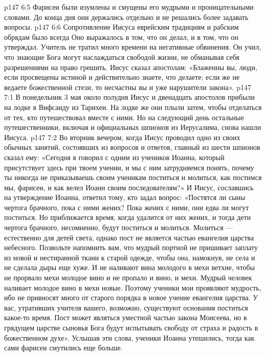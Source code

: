 \vs p147 6:5 Фарисеи были изумлены и смущены его мудрыми и проницательными словами. До конца дня они держались отдельно и не решались более задавать вопросы.
\vs p147 6:6 \pc Сопротивление Иисуса еврейским традициям и рабским обрядам было всегда  Оно выражалось в том, что он делал, и в том, что он утверждал. Учитель не тратил много времени на негативные обвинения. Он учил, что знающие Бога могут наслаждаться свободой жизни, не обманывая себя разрешениями на право грешить. Иисус сказал апостолам: «Блаженны вы, люди, если просвещены истиной и действительно знаете, что делаете; если же не ведаете божественной стези, то несчастны вы и уже нарушители закона».
\vs p147 7:1 В понедельник 3 мая около полудня Иисус и двенадцать апостолов прибыли на лодке в Вифсаиду из Тарихеи. На лодке же они плыли затем, чтобы отделаться от тех, кто путешествовал вместе с ними. Но на следующий день остальные путешественники, включая и официальных шпионов из Иерусалима, снова нашли Иисуса.
\vs p147 7:2 Во вторник вечером, когда Иисус проводил одно из своих обычных занятий, состоявших из вопросов и ответов, главный из шести шпионов сказал ему: «Сегодня я говорил с одним из учеников Иоанна, который присутствует здесь при твоем учении, и мы с ним затрудняемся понять, почему ты никогда не приказываешь своим ученикам поститься и молиться, как постимся мы, фарисеи, и как велел Иоанн своим последователям?» И Иисус, сославшись на утверждение Иоанна, ответил тому, кто задал вопрос: «Постятся ли сыны чертога брачного, пока с ними жених? Пока жених с ними, они едва ли могут поститься. Но приближается время, когда удалится от них жених, и тогда дети чертога брачного, несомненно, будут поститься и молиться. Молиться --- естественно для детей света, однако пост не является частью евангелия царства небесного. Позвольте напомнить вам, что мудрый портной не пришивает заплату из новой и нестиранной ткани к старой одежде, чтобы она, намокнув, не села и не сделала дыры еще хуже. И не наливают вина молодого в мехи ветхие, чтобы не прорвало мехи молодое вино и не пропало и вино, и мехи. Мудрый человек наливает молодое вино в мехи новые. Поэтому ученики мои проявляют мудрость, ибо не привносят много от старого порядка в новое учение евангелия царства. У вас, утративших учителя вашего, возможно, существуют основания поститься какое\hyp{}то время. Пост может являться уместной частью закона Моисеева, но в грядущем царстве сыновья Бога будут испытывать свободу от страха и радость в божественном духе». Услышав эти слова, ученики Иоанна утешились, тогда как сами фарисеи смутились еще больше.
